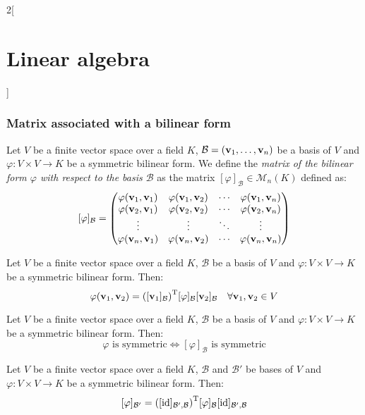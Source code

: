 \documentclass[../../../main.tex]{subfiles}
\begin{document}
\begin{multicols}{2}[\section{Linear algebra}]
  \subsubsection{Matrix associated with a bilinear form}
  \begin{definition}
    Let $V$ be a finite vector space over a field $K$, $\mathcal{B}=(\boldsymbol{\mathrm{v}}_1,\ldots,\boldsymbol{\mathrm{v}}_n)$ be a basis of $V$ and $\varphi:V\times V\rightarrow K$ be a symmetric bilinear form. We define the \textit{matrix of the bilinear form $\varphi$ with respect to the basis $\mathcal{B}$} as the matrix $[\varphi]_\mathcal{B}\in\mathcal{M}_n(K)$ defined as: $$[\varphi]_\mathcal{B}=
      \begin{pmatrix}
        \varphi(\boldsymbol{\mathrm{v}}_1,\boldsymbol{\mathrm{v}}_1) & \varphi(\boldsymbol{\mathrm{v}}_1,\boldsymbol{\mathrm{v}}_2) & \cdots & \varphi(\boldsymbol{\mathrm{v}}_1,\boldsymbol{\mathrm{v}}_n) \\
        \varphi(\boldsymbol{\mathrm{v}}_2,\boldsymbol{\mathrm{v}}_1) & \varphi(\boldsymbol{\mathrm{v}}_2,\boldsymbol{\mathrm{v}}_2) & \cdots & \varphi(\boldsymbol{\mathrm{v}}_2,\boldsymbol{\mathrm{v}}_n) \\
        \vdots                                             & \vdots                                             & \ddots & \vdots                                             \\
        \varphi(\boldsymbol{\mathrm{v}}_n,\boldsymbol{\mathrm{v}}_1) & \varphi(\boldsymbol{\mathrm{v}}_n,\boldsymbol{\mathrm{v}}_2) & \cdots & \varphi(\boldsymbol{\mathrm{v}}_n,\boldsymbol{\mathrm{v}}_n) \\
      \end{pmatrix}$$
  \end{definition}
  \begin{lemma}
    Let $V$ be a finite vector space over a field $K$, $\mathcal{B}$ be a basis of $V$ and $\varphi:V\times V\rightarrow K$ be a symmetric bilinear form. Then:
    $$\varphi(\boldsymbol{\mathrm{v}}_1,\boldsymbol{\mathrm{v}}_2)={\left([\boldsymbol{\mathrm{v}}_1]_\mathcal{B}\right)}^\mathrm{T}[\varphi]_\mathcal{B}[\boldsymbol{\mathrm{v}}_2]_\mathcal{B}\quad\forall\boldsymbol{\mathrm{v}}_1,\boldsymbol{\mathrm{v}}_2\in V$$
  \end{lemma}
  \begin{prop}
    Let $V$ be a finite vector space over a field $K$, $\mathcal{B}$ be a basis of $V$ and $\varphi:V\times V\rightarrow K$ be a symmetric bilinear form. Then: $$\varphi\text{ is symmetric}\iff[\varphi]_\mathcal{B}\text{ is symmetric}$$
  \end{prop}
  \begin{prop}
    Let $V$ be a finite vector space over a field $K$, $\mathcal{B}$ and $\mathcal{B}'$ be bases of $V$ and $\varphi:V\times V\rightarrow K$ be a symmetric bilinear form. Then: $$[\varphi]_{\mathcal{B}'}={([\mathrm{id}]_{\mathcal{B}',\mathcal{B}})}^\mathrm{T}[\varphi]_\mathcal{B}[\mathrm{id}]_{\mathcal{B}',\mathcal{B}}$$
  \end{prop}

\end{multicols}
\end{document}
